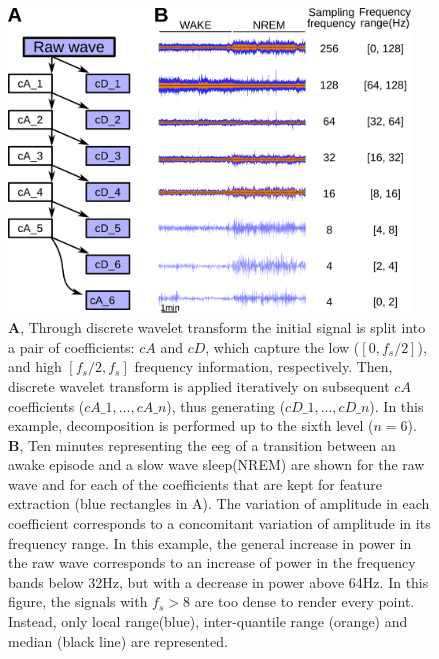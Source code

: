 \begin{figure}[h!]
  \centering   
    \includegraphics[width=0.95\textwidth]{figures/dwd.pdf}
  \caption{
	\textbf{A}, Through discrete wavelet transform the initial signal is split into a pair of coefficients: $cA$ and $cD$, which capture the low ($[0, f_s/2]$), and high $[f_s/2, f_s]$ frequency information, respectively.
	Then, discrete wavelet transform is applied iteratively on subsequent $cA$ coefficients ($cA\_1, ..., cA\_n$), thus generating ($cD\_1, ..., cD\_n$).
	In this example, decomposition is performed up to the sixth level ($n=6$).
	\textbf{B}, 
	Ten minutes representing the \gls{eeg} of a transition between an awake episode and a slow wave sleep(NREM) are shown for the raw
	 wave and for each of the coefficients that are kept for feature extraction (blue rectangles in A).
	 The variation of amplitude in each coefficient corresponds to a concomitant variation of amplitude in its frequency range.
	 In this example, the general increase in power in the raw wave corresponds to an increase of power in the frequency bands below 32Hz, but with a decrease in power above 64Hz.
	In this figure, the signals with $f_s > 8$ are too dense to render every point. 
	Instead, only local range(blue), inter-quantile range (orange) and median (black line) are represented.
  \label{fig:dwd}
  }
\end{figure}





